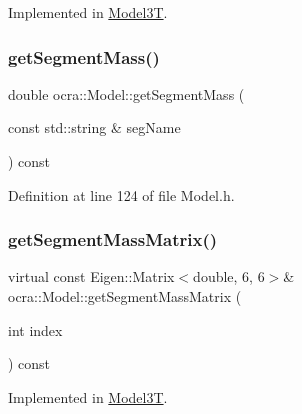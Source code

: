Implemented in \hyperlink{classModel3T_a644b29c19a8a08e82f74ff411f5963df}{Model3T}.

\hypertarget{classocra_1_1Model_aae854cb3ec08b4490d8529e92ff6ac8c}{}\label{classocra_1_1Model_aae854cb3ec08b4490d8529e92ff6ac8c} 
\subsubsection{\texorpdfstring{get\+Segment\+Mass()}{getSegmentMass()}\hspace{0.1cm}{\footnotesize\ttfamily [2/2]}}
{\footnotesize\ttfamily double ocra\+::\+Model\+::get\+Segment\+Mass (\begin{DoxyParamCaption}\item[{const std\+::string \&}]{seg\+Name }\end{DoxyParamCaption}) const\hspace{0.3cm}{\ttfamily [inline]}}



Definition at line 124 of file Model.\+h.

\hypertarget{classocra_1_1Model_ae795ffdaa76419eb74acba87555b83bb}{}\label{classocra_1_1Model_ae795ffdaa76419eb74acba87555b83bb} 
\subsubsection{\texorpdfstring{get\+Segment\+Mass\+Matrix()}{getSegmentMassMatrix()}\hspace{0.1cm}{\footnotesize\ttfamily [1/2]}}
{\footnotesize\ttfamily virtual const Eigen\+::\+Matrix$<$double, 6, 6$>$\& ocra\+::\+Model\+::get\+Segment\+Mass\+Matrix (\begin{DoxyParamCaption}\item[{int}]{index }\end{DoxyParamCaption}) const\hspace{0.3cm}{\ttfamily [pure virtual]}}



Implemented in \hyperlink{classModel3T_a5bd15fc87b6490e3828953073b52a836}{Model3T}.

\hypertarget{classocra_1_1Model_a6462d992c0da4ca1651478b8007370cc}{}\label{classocra_1_1Model_a6462d992c0da4ca1651478b8007370cc} 

